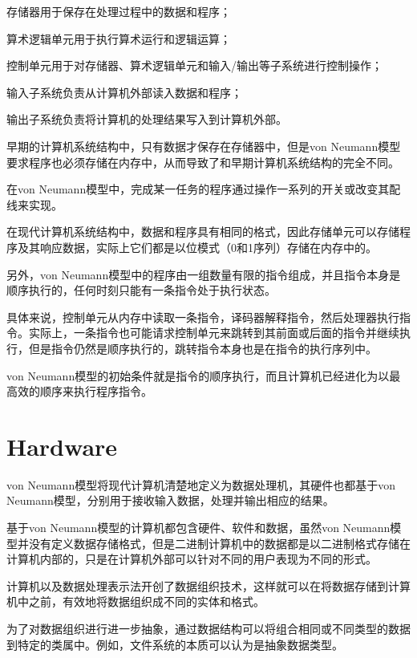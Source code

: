 \begin{compactitem}
\item 存储器用于保存在处理过程中的数据和程序；
\item 算术逻辑单元用于执行算术运行和逻辑运算；
\item 控制单元用于对存储器、算术逻辑单元和输入/输出等子系统进行控制操作；
\item 输入子系统负责从计算机外部读入数据和程序；
\item 输出子系统负责将计算机的处理结果写入到计算机外部。
\end{compactitem}

早期的计算机系统结构中，只有数据才保存在存储器中，但是von Neumann模型要求程序也必须存储在内存中，从而导致了和早期计算机系统结构的完全不同。

在von Neumann模型中，完成某一任务的程序通过操作一系列的开关或改变其配线来实现。

在现代计算机系统结构中，数据和程序具有相同的格式，因此存储单元可以存储程序及其响应数据，实际上它们都是以位模式（0和1序列）存储在内存中的。

另外，von Neumann模型中的程序由一组数量有限的指令组成，并且指令本身是顺序执行的，任何时刻只能有一条指令处于执行状态。

具体来说，控制单元从内存中读取一条指令，译码器解释指令，然后处理器执行指令。实际上，一条指令也可能请求控制单元来跳转到其前面或后面的指令并继续执行，但是指令仍然是顺序执行的，跳转指令本身也是在指令的执行序列中。

von Neumann模型的初始条件就是指令的顺序执行，而且计算机已经进化为以最高效的顺序来执行程序指令。

\section{Hardware}


von Neumann模型将现代计算机清楚地定义为数据处理机，其硬件也都基于von Neumann模型，分别用于接收输入数据，处理并输出相应的结果。

基于von Neumann模型的计算机都包含硬件、软件和数据，虽然von Neumann模型并没有定义数据存储格式，但是二进制计算机中的数据都是以二进制格式存储在计算机内部的，只是在计算机外部可以针对不同的用户表现为不同的形式。

计算机以及数据处理表示法开创了数据组织技术，这样就可以在将数据存储到计算机中之前，有效地将数据组织成不同的实体和格式。

为了对数据组织进行进一步抽象，通过数据结构可以将组合相同或不同类型的数据到特定的类属中。例如，文件系统的本质可以认为是抽象数据类型。

